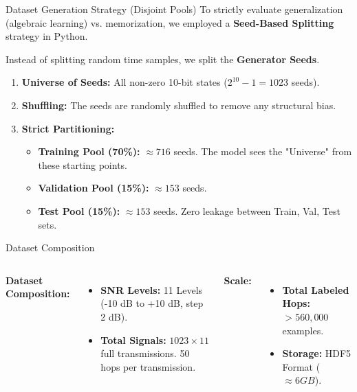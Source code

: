 \documentclass[aspectratio=169, 11pt]{beamer}
\begin{document}
\begin{frame}{Dataset Generation Strategy (Disjoint Pools)}
    To strictly evaluate generalization (algebraic learning) vs. memorization, we employed a \textbf{Seed-Based Splitting} strategy in Python.
    
    \begin{tcolorbox}[colback=blue!5, colframe=blue!40, title=The "Pool" Logic (\texttt{generate\_dataset.py})]
    Instead of splitting random time samples, we split the \textbf{Generator Seeds}.
    \begin{enumerate}
        \item \textbf{Universe of Seeds:} All non-zero 10-bit states ($2^{10}-1 = 1023$ seeds).
        \item \textbf{Shuffling:} The seeds are randomly shuffled to remove any structural bias.
        \item \textbf{Strict Partitioning:}
        \begin{itemize}
            \item \textbf{Training Pool (70\%):} $\approx 716$ seeds. The model sees the "Universe" from these starting points.
            \item \textbf{Validation Pool (15\%):} $\approx 153$ seeds. 
            \item \textbf{Test Pool (15\%):} $\approx 153$ seeds. 
            Zero leakage between Train, Val, Test sets.
        \end{itemize}
    \end{enumerate}
    \end{tcolorbox}
    \vspace{0.5em}
\end{frame}

\begin{frame}{Dataset Composition}

    \begin{columns}
        \textbf{Dataset Composition:}
        \begin{itemize}
            \item \textbf{SNR Levels:} 11 Levels (-10 dB to +10 dB, step 2 dB).
            \item \textbf{Total Signals:} $1023\times11$ full transmissions. 50 hops per transmission.
        \end{itemize}
        
        \textbf{Scale:}
        \begin{itemize}
            \item \textbf{Total Labeled Hops:} $>560,000$ examples.
            \item \textbf{Storage:} HDF5 Format ($\approx 6 GB$).
        \end{itemize}
    \end{columns}
        
\end{frame}
\end{document}

